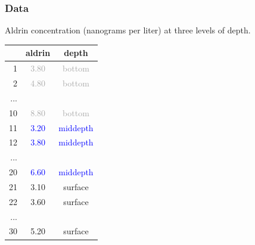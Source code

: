 
\begin{frame}
\frametitle{Data}

Aldrin concentration (nanograms per liter) at three levels of depth. \\

\begin{center}
\begin{tabular}{r | c | c}
\hline
 	& aldrin 					& depth \\ 
\hline
1 	& \textcolor{darkGray}{3.80} 	& \textcolor{darkGray}{bottom}  \\ 
2 	& \textcolor{darkGray}{4.80} 	& \textcolor{darkGray}{bottom}  \\ 
...	&						& \\
10	& \textcolor{darkGray}{8.80} 	& \textcolor{darkGray}{bottom} \\
11	& \textcolor{blue}{3.20} 		& \textcolor{blue}{middepth}  \\
12	& \textcolor{blue}{3.80} 		& \textcolor{blue}{middepth} \\
...	&						& \\
20 	& \textcolor{blue}{6.60} 		& \textcolor{blue}{middepth} \\
21	& \textcolor{oiB}{3.10} 		& \textcolor{oiB}{surface} \\
22	& \textcolor{oiB}{3.60} 		& \textcolor{oiB}{surface} \\
...	&						& \\
30 	& \textcolor{oiB}{5.20} 		& \textcolor{oiB}{surface} \\  
\hline
\end{tabular}
\end{center}

\end{frame}


